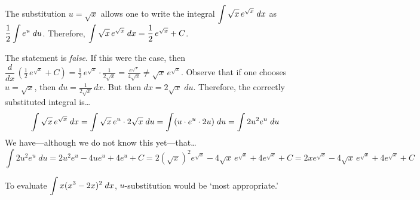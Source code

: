 \documentclass[11pt,letterpaper]{article}
\begin{document}
\newpage



 The substitution $u= \sqrt{x}$ allows one to write the integral $\displaystyle\int\sqrt{x} \, e^{\sqrt{x}}\;dx$ as $\displaystyle\frac{1}{2} \int e^u \;du$. Therefore, $\displaystyle\int \sqrt{x} \, e^{\sqrt{x}} \;dx= \frac{1}{2}\, e^{\sqrt{x}} + C$. \pspace

\sol The statement is \textit{false}. If this were the case, then $\dfrac{d}{dx} \,(\frac{1}{2}\, e^{\sqrt{x}} + C)= \frac{1}{2}\, e^{\sqrt{x}} \cdot \frac{1}{2 \sqrt{x}} = \frac{e^{\sqrt{x}}}{4 \sqrt{x}} \neq \sqrt{x} \, e^{\sqrt{x}}$. Observe that if one chooses $u= \sqrt{x}$, then $du= \frac{1}{2\sqrt{x}} \,dx$. But then $dx= 2 \sqrt{x} \;du$. Therefore, the correctly substituted integral is\dots
	\[
	\displaystyle\int\sqrt{x} \, e^{\sqrt{x}}\;dx= \int \sqrt{x} \, e^u \cdot 2 \sqrt{x} \; du= \int (u \cdot e^u \cdot 2u) \;du= \int 2u^2 e^u \;du
	\]
We have---although we do not know this yet---that\dots
	\[
	 \int 2u^2 e^u \;du= 2 u^2 e^u - 4 u e^u + 4e^u + C= 2 (\sqrt{x})^2 e^{\sqrt{x}} - 4 \sqrt{x}\, e^{\sqrt{x}} + 4e^{\sqrt{x}} + C= 2x e^{\sqrt{x}} - 4 \sqrt{x}\, e^{\sqrt{x}} + 4e^{\sqrt{x}} + C
	\] \pvspace{1.3cm}



 To evaluate $\displaystyle\int x(x^3 - 2x)^2 \;dx$, $u$-substitution would be `most appropriate.'
\end{document}
